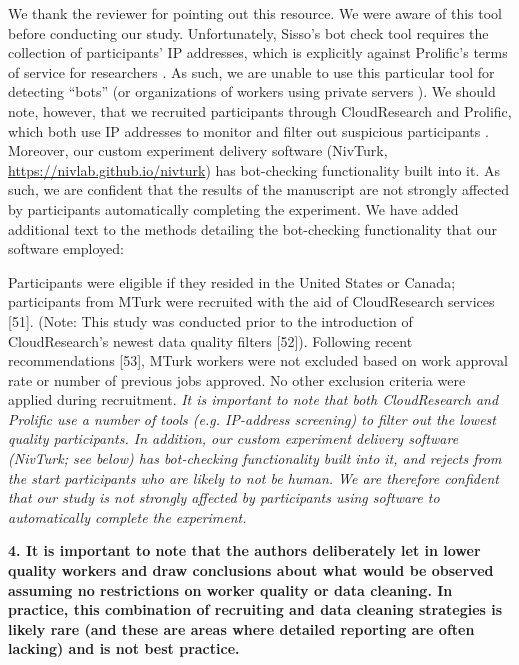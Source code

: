 \documentclass[a4paper,notitlepage,12pt]{article}
\begin{document}
We thank the reviewer for pointing out this resource. We were aware of this tool before conducting our study. Unfortunately, Sisso's bot check tool requires the collection of participants' IP addresses, which is explicitly against Prolific's terms of service for researchers \cite{prolific_ip_address}. As such, we are unable to use this particular tool for detecting ``bots'' (or organizations of workers using private servers \cite{dennis2020online}). We should note, however, that we recruited participants through CloudResearch and Prolific, which both use IP addresses to monitor and filter out suspicious participants \cite{cloudresearch_ip_address, prolific_ip_address_2}. Moreover, our custom experiment delivery software (NivTurk, \url{https://nivlab.github.io/nivturk}) has bot-checking functionality built into it. As such, we are confident that the results of the manuscript are not strongly affected by participants automatically completing the experiment. We have added additional text to the methods detailing the bot-checking functionality that our software employed:

\begin{displayquote}
Participants were eligible if they resided in the United States or Canada; participants from MTurk were recruited with the aid of CloudResearch services [51]. (Note: This study was conducted prior to the introduction of CloudResearch’s newest data quality filters [52]). Following recent recommendations [53], MTurk workers were not excluded based on work approval rate or number of previous jobs approved. No other exclusion criteria were applied during recruitment. \textit{It is important to note that both CloudResearch and Prolific use a number of tools (e.g. IP-address screening) to filter out the lowest quality participants. In addition, our custom experiment delivery software (NivTurk; see below) has bot-checking functionality built into it, and rejects from the start participants who are likely to not be human. We are therefore confident that our study is not strongly affected by participants using software to automatically complete the experiment.}
\end{displayquote}

\textbf{4. It is important to note that the authors deliberately let in lower quality workers and draw conclusions about what would be observed assuming no restrictions on worker quality or data cleaning. In practice, this combination of recruiting and data cleaning strategies is likely rare (and these are areas where detailed reporting are often lacking) and is not best practice.}
\end{document}
